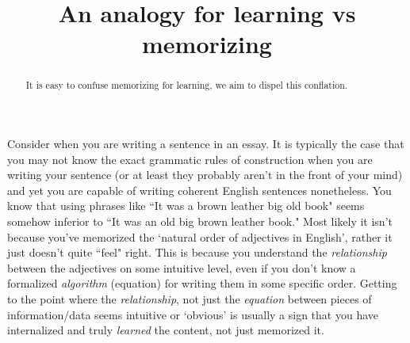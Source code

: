 \documentclass{ximera}
\title{An analogy for learning vs memorizing}
\begin{document}
\begin{abstract}
It is easy to confuse memorizing for learning, we aim to dispel this conflation.
\end{abstract}
\maketitle

Consider when you are writing a sentence in an essay. It is typically the case that you may not know the exact grammatic rules of construction when you are writing your sentence (or at least they probably aren't in the front of your mind) and yet you are capable of writing coherent English sentences nonetheless. You know that using phrases like ``It was a brown leather big old book" seems somehow inferior to ``It was an old big brown leather book." Most likely it isn't because you've memorized the `natural order of adjectives in English', rather it just doesn't quite ``feel" right. This is because you understand the \textit{relationship} between the adjectives on some intuitive level, even if you don't know a formalized \textit{algorithm} (equation) for writing them in some specific order. Getting to the point where the \textit{relationship}, not just the \textit{equation} between pieces of information/data seems intuitive or `obvious' is usually a sign that you have internalized and truly \textit{learned} the content, not just memorized it.
\end{document}
